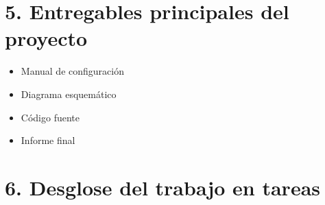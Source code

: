 \documentclass[11pt]{charter}
\begin{document}
\section{5. Entregables principales del proyecto}
\label{sec:entregables}

\begin{itemize}
\item Manual de configuración
\item Diagrama esquemático
\item Código fuente
\item Informe final
\end{itemize}

\section{6. Desglose del trabajo en tareas}
\label{sec:wbs}
\end{document}
